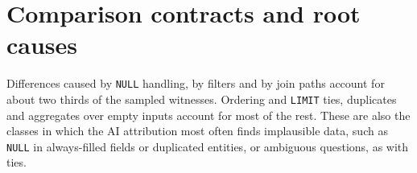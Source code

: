 \appendix
\section{Comparison contracts and root causes}\label{app:contracts}

\begin{table}[h]
\centering\small
\caption{First-freeze $\mathcal A_{1f}$ witnesses on EX-correct test pairs under the three comparison contracts. For SpotIt and SpotIt+, we count re-certified released counterexamples; for random fuzzing, we report corrected counts. Every $\mathcal C_{\mathrm{set}}$ difference is also a $\mathcal C_{\mathrm{bag}}$ difference. $\mathcal C_{\mathrm{len}}$ additionally equates an empty result with one all-\texttt{NULL} row and compares numbers to nine significant digits.}\label{tab:contracts}
\end{table}

\begin{table}[h]
\centering\small
\caption{Primary root cause of the difference for a random sample of 100 distinct first-freeze CaliberGraph witnesses. The causes come from AI annotation in two independent passes ($\kappa=\V{taxKappa}$); no human check of root causes was made. Rule-based labels derived from the query structure contained the annotated primary cause in  of 100 cases. However, they assigned many additional labels, so we report the annotated causes.}\label{tab:taxonomy}
\end{table}

Differences caused by \texttt{NULL} handling, by filters and by join paths account for about two thirds of the sampled witnesses. Ordering and \texttt{LIMIT} ties, duplicates and aggregates over empty inputs account for most of the rest. These are also the classes in which the AI attribution most often finds implausible data, such as \texttt{NULL} in always-filled fields or duplicated entities, or ambiguous questions, as with ties.

